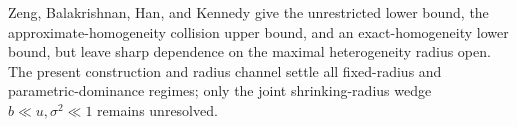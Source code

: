 Zeng, Balakrishnan, Han, and Kennedy give the unrestricted lower bound, the approximate-homogeneity collision upper bound, and an exact-homogeneity lower bound, but leave sharp dependence on the maximal heterogeneity radius open.  The present construction and radius channel settle all fixed-radius and parametric-dominance regimes; only the joint shrinking-radius wedge \(b\ll u,\sigma^2\ll1\) remains unresolved.